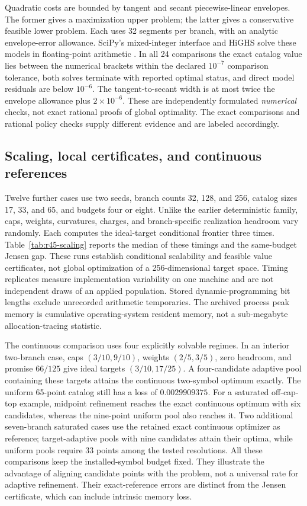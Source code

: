 Quadratic costs are bounded by tangent and secant piecewise-linear envelopes. The former gives a maximization upper problem; the latter gives a conservative feasible lower problem. Each uses 32 segments per branch, with an analytic envelope-error allowance. SciPy's mixed-integer interface and HiGHS solve these models in floating-point arithmetic \citep{Virtanen2020,HuangfuHall2018}. In all 24 comparisons the exact catalog value lies between the numerical brackets within the declared $10^{-7}$ comparison tolerance, both solves terminate with reported optimal status, and direct model residuals are below $10^{-6}$. The tangent-to-secant width is at most twice the envelope allowance plus $2\times10^{-6}$. These are independently formulated \emph{numerical} checks, not exact rational proofs of global optimality. The exact comparisons and rational policy checks supply different evidence and are labeled accordingly.

\subsection{Scaling, local certificates, and continuous references}
Twelve further cases use two seeds, branch counts 32, 128, and 256, catalog sizes 17, 33, and 65, and budgets four or eight. Unlike the earlier deterministic family, caps, weights, curvatures, charges, and branch-specific realization headroom vary randomly. Each computes the ideal-target conditional frontier three times. Table~\ref{tab:r45-scaling} reports the median of these timings and the same-budget Jensen gap. These runs establish conditional scalability and feasible value certificates, not global optimization of a 256-dimensional target space. Timing replicates measure implementation variability on one machine and are not independent draws of an applied population. Stored dynamic-programming bit lengths exclude unrecorded arithmetic temporaries. The archived process peak memory is cumulative operating-system resident memory, not a sub-megabyte allocation-tracing statistic.

The continuous comparison uses four explicitly solvable regimes. In an interior two-branch case, caps $(3/10,9/10)$, weights $(2/5,3/5)$, zero headroom, and promise $66/125$ give ideal targets $(3/10,17/25)$. A four-candidate adaptive pool containing these targets attains the continuous two-symbol optimum exactly. The uniform 65-point catalog still has a loss of $0.0029909375$. For a saturated off-cap-top example, midpoint refinement reaches the exact continuous optimum with six candidates, whereas the nine-point uniform pool also reaches it. Two additional seven-branch saturated cases use the retained exact continuous optimizer as reference; target-adaptive pools with nine candidates attain their optima, while uniform pools require 33 points among the tested resolutions. All these comparisons keep the installed-symbol budget fixed. They illustrate the advantage of aligning candidate points with the problem, not a universal rate for adaptive refinement. Their exact-reference errors are distinct from the Jensen certificate, which can include intrinsic memory loss.

